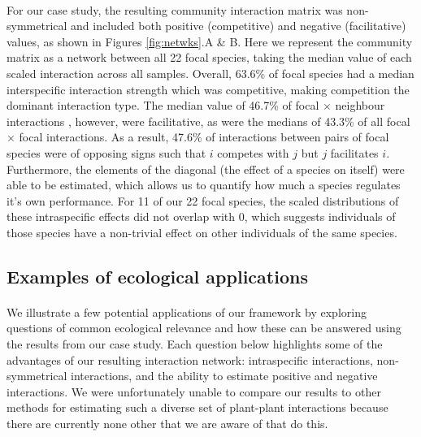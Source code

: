 \documentclass[a4,12pt]{article}
\begin{document}
    \paragraph{}
    For our case study, the resulting community interaction matrix was non-symmetrical and included both positive (competitive) and negative (facilitative) values, as shown in Figures \ref{fig:netwks}.A \& B. Here we represent the community matrix as a network between all 22 focal species, taking the median value of each scaled interaction  across all samples. Overall, 63.6\% of focal species had a median interspecific interaction strength which was competitive, making competition the dominant interaction type. The median value of 46.7\% of focal $\times$ neighbour interactions , however, were facilitative, as were the medians of 43.3\% of all focal $\times$ focal interactions. As a result, 47.6\% of interactions between pairs of focal species were of opposing signs such that $i$ competes with $j$ but $j$ facilitates $i$. Furthermore, the elements of the diagonal (the effect of a species on itself) were able to be estimated, which allows us to quantify how much a species regulates it's own performance. For 11 of our 22 focal species, the scaled distributions of these intraspecific effects did not overlap with 0, which suggests individuals of those species have a non-trivial effect on other individuals of the same species.




    \subsection{Examples of ecological applications}

    \paragraph{}
    We illustrate a few potential applications of our framework by exploring questions of common ecological relevance and how these can be answered using the results from our case study. Each question below highlights some of the advantages of our resulting interaction network: intraspecific interactions, non-symmetrical interactions, and the ability to estimate positive and negative interactions. We were unfortunately unable to compare our results to other methods for estimating such a diverse set of plant-plant interactions because there are currently none other that we are aware of that do this.
\end{document}
